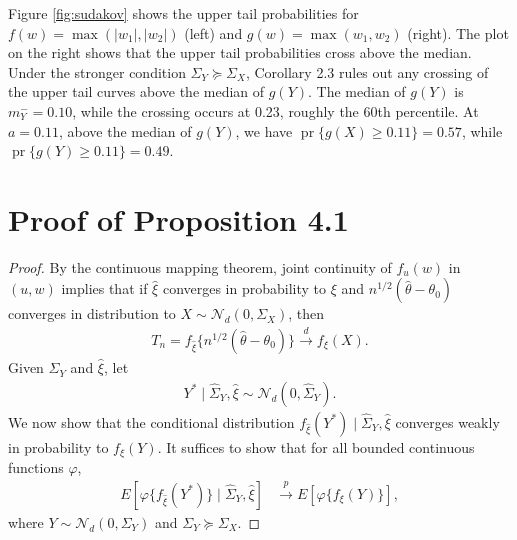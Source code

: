 \documentclass[11pt]{article}
\newcommand{\1}{\mathbbm{1}}
\theoremstyle{plain}
\theoremstyle{definition}
\begin{document}
Figure \ref{fig:sudakov} shows the upper tail probabilities for $f(w) = \max(|w_1|, |w_2|)$ (left) and $g(w) = \max(w_1,w_2)$ (right). The plot on the right shows that the upper tail probabilities cross above the median. Under the stronger condition $\Sigma_Y\succeq \Sigma_X$, Corollary 2.3 rules out any crossing of the upper tail curves above the median of $g(Y)$. The median of $g(Y)$ is $m^{-}_Y=0.10$, while the crossing occurs at 0.23, roughly the 60th percentile. At $a=0.11$, above the median of $g(Y)$, we have $\operatorname{pr}\{g(X)\geq 0.11\} = 0.57$, while $\operatorname{pr}\{g(Y)\geq 0.11\} = 0.49$.

\section{Proof of Proposition 4.1}
\begin{proof}
By the continuous mapping theorem, joint continuity of $f_u(w)$ in $(u, w)$ implies that if $\hat{\xi}$ converges in probability to $\xi$ and $n^{1/2}(\hat{\theta}-\theta_0)$ converges in distribution to $X \sim \mathcal{N}_d(0, \Sigma_X)$, then 
\begin{align*} T_n = f_{\hat{\xi}}\{n^{1/2}(\hat{\theta}-\theta_0)\} \overset{d}{\rightarrow} f_\xi(X).\end{align*} Given $\hat{\Sigma}_Y$ and $\hat{\xi}$, let 
\begin{align*} Y^*\mid \hat{\Sigma}_Y,\hat{\xi} \sim \mathcal{N}_{d}(0, \hat{\Sigma}_Y).\end{align*} We now show that the conditional distribution $f_{\hat{\xi}}(Y^*)\mid \hat{\Sigma}_Y, \hat{\xi}$ converges weakly in probability to $f_{\xi}(Y)$. It suffices to show that for all bounded continuous functions $\varphi$,
\begin{align*} E[\varphi\{f_{\hat{\xi}}(Y^*)\}\mid \hat{\Sigma}_Y, \hat{\xi}] &\overset{p}{\rightarrow} E[\varphi\{f_{{\xi}}(Y)\}],\end{align*} where $Y\sim \mathcal{N}_d(0,\Sigma_Y)$ and $\Sigma_Y\succeq \Sigma_X$. 


\end{proof}
\end{document}
